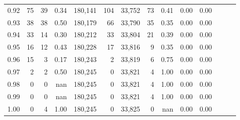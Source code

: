 \begin{tabular}{rrrrrrrrrrrrrr}
0.92 &     75 &   39 &  0.34 &  180,141 &      104 &  33,752 &      73 &  0.41 &  0.00 &      0.00 \\
0.93 &     38 &   38 &  0.50 &  180,179 &       66 &  33,790 &      35 &  0.35 &  0.00 &      0.00 \\
0.94 &     33 &   14 &  0.30 &  180,212 &       33 &  33,804 &      21 &  0.39 &  0.00 &      0.00 \\
0.95 &     16 &   12 &  0.43 &  180,228 &       17 &  33,816 &       9 &  0.35 &  0.00 &      0.00 \\
0.96 &     15 &    3 &  0.17 &  180,243 &        2 &  33,819 &       6 &  0.75 &  0.00 &      0.00 \\
0.97 &      2 &    2 &  0.50 &  180,245 &        0 &  33,821 &       4 &  1.00 &  0.00 &      0.00 \\
0.98 &      0 &    0 &   nan &  180,245 &        0 &  33,821 &       4 &  1.00 &  0.00 &      0.00 \\
0.99 &      0 &    0 &   nan &  180,245 &        0 &  33,821 &       4 &  1.00 &  0.00 &      0.00 \\
1.00 &      0 &    4 &  1.00 &  180,245 &        0 &  33,825 &       0 &   nan &  0.00 &      0.00 \\
\bottomrule
\end{tabular}
